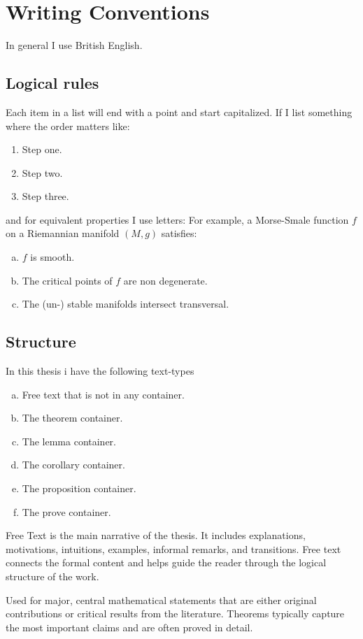 \section{Writing Conventions} 
In general I use British English.
\subsection{Logical rules}
Each item in a list will end with a point and start capitalized.
If I list something where the order matters like:
\begin{enumerate}
	\item Step one.
	\item Step two.
	\item Step three.
\end{enumerate}
and for equivalent properties I use letters: For example, a Morse-Smale function $f$ on a Riemannian manifold $(M,g)$ satisfies:
\begin{enumerate}[(a)]
	\item $f$ is smooth.
	\item The critical points of $f$ are non degenerate.
	\item The (un-) stable manifolds intersect transversal.
\end{enumerate}

\subsection{Structure}
In this thesis i have the following text-types
\begin{enumerate}[(a)]
	\item Free text that is not in any container.
	\item The theorem container.
	\item The lemma container.
	\item The corollary container.
	\item The proposition container.
	\item The prove container.
\end{enumerate}
Free Text is the main narrative of the thesis. It includes explanations, motivations, intuitions, examples, informal remarks, and transitions. Free text connects the formal content and helps guide the reader through the logical structure of the work.
\begin{theorem}[An Example]
	Used for major, central mathematical statements that are either original contributions or critical results from the literature. Theorems typically capture the most important claims and are often proved in detail.
\end{theorem}


